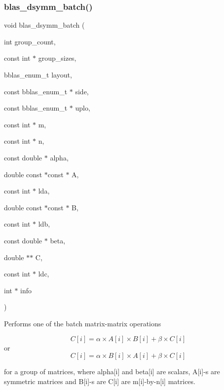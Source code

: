 \subsubsection{\texorpdfstring{blas\+\_\+dsymm\+\_\+batch()}{blas\_dsymm\_batch()}}
{\footnotesize\ttfamily void blas\+\_\+dsymm\+\_\+batch (\begin{DoxyParamCaption}\item[{int}]{group\+\_\+count,  }\item[{const int $\ast$}]{group\+\_\+sizes,  }\item[{bblas\+\_\+enum\+\_\+t}]{layout,  }\item[{const bblas\+\_\+enum\+\_\+t $\ast$}]{side,  }\item[{const bblas\+\_\+enum\+\_\+t $\ast$}]{uplo,  }\item[{const int $\ast$}]{m,  }\item[{const int $\ast$}]{n,  }\item[{const double $\ast$}]{alpha,  }\item[{double const $\ast$const $\ast$}]{A,  }\item[{const int $\ast$}]{lda,  }\item[{double const $\ast$const $\ast$}]{B,  }\item[{const int $\ast$}]{ldb,  }\item[{const double $\ast$}]{beta,  }\item[{double $\ast$$\ast$}]{C,  }\item[{const int $\ast$}]{ldc,  }\item[{int $\ast$}]{info }\end{DoxyParamCaption})}

Performs one of the batch matrix-\/matrix operations

\[ C[i] = \alpha \times A[i] \times B[i] + \beta \times C[i] \] or \[ C[i] = \alpha \times B[i] \times A[i] + \beta \times C[i] \]

for a group of matrices, where alpha\mbox{[}i\mbox{]} and beta\mbox{[}i\mbox{]} are scalars, A\mbox{[}i\mbox{]}-\/s are symmetric matrices and B\mbox{[}i\mbox{]}-\/s are C\mbox{[}i\mbox{]} are m\mbox{[}i\mbox{]}-\/by-\/n\mbox{[}i\mbox{]} matrices.


